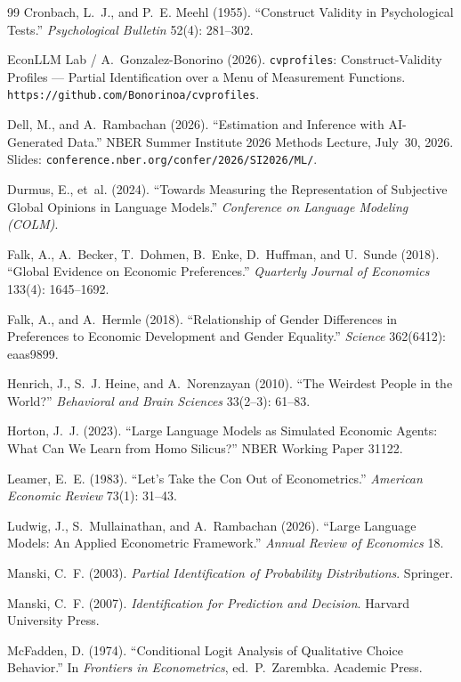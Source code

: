 \documentclass[11pt,letterpaper]{article}
\begin{document}
\begin{thebibliography}{99}
Cronbach, L.~J., and P.~E. Meehl (1955).
``Construct Validity in Psychological Tests.''
\textit{Psychological Bulletin} 52(4): 281--302.

EconLLM Lab / A.~Gonzalez-Bonorino (2026).
\texttt{cvprofiles}: Construct-Validity Profiles --- Partial Identification over a Menu of Measurement Functions.
\texttt{https://github.com/Bonorinoa/cvprofiles}.

Dell, M., and A.~Rambachan (2026).
``Estimation and Inference with AI-Generated Data.''
NBER Summer Institute 2026 Methods Lecture, July~30, 2026.
Slides: \texttt{conference.nber.org/confer/2026/SI2026/ML/}.

Durmus, E., et~al. (2024).
``Towards Measuring the Representation of Subjective Global Opinions in Language Models.''
\textit{Conference on Language Modeling (COLM)}.

Falk, A., A.~Becker, T.~Dohmen, B.~Enke, D.~Huffman, and U.~Sunde (2018).
``Global Evidence on Economic Preferences.''
\textit{Quarterly Journal of Economics} 133(4): 1645--1692.

Falk, A., and A.~Hermle (2018).
``Relationship of Gender Differences in Preferences to Economic Development and Gender Equality.''
\textit{Science} 362(6412): eaas9899.

Henrich, J., S.~J. Heine, and A.~Norenzayan (2010).
``The Weirdest People in the World?''
\textit{Behavioral and Brain Sciences} 33(2--3): 61--83.

Horton, J.~J. (2023).
``Large Language Models as Simulated Economic Agents: What Can We Learn from Homo Silicus?''
NBER Working Paper 31122.

Leamer, E.~E. (1983).
``Let's Take the Con Out of Econometrics.''
\textit{American Economic Review} 73(1): 31--43.

Ludwig, J., S.~Mullainathan, and A.~Rambachan (2026).
``Large Language Models: An Applied Econometric Framework.''
\textit{Annual Review of Economics} 18.

Manski, C.~F. (2003).
\textit{Partial Identification of Probability Distributions}.
Springer.

Manski, C.~F. (2007).
\textit{Identification for Prediction and Decision}.
Harvard University Press.

McFadden, D. (1974).
``Conditional Logit Analysis of Qualitative Choice Behavior.''
In \textit{Frontiers in Econometrics}, ed.~P.~Zarembka. Academic Press.


\end{thebibliography}
\end{document}
